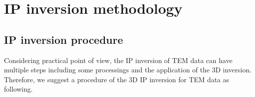 \documentclass[a4paper, 11pt]{article}
\newcommand{\siginf}{\sigma_\infty}
\newcommand{\peta}{\tilde{\eta}}
\begin{document}
\clearpage

\section{IP inversion methodology}

\subsection{IP inversion procedure}
Considering practical point of view, the IP inversion of TEM data can have multiple steps including some processings and the application of the 3D inversion. Therefore, we suggest a procedure of the 3D IP inversion for TEM data as following.
\end{document}

